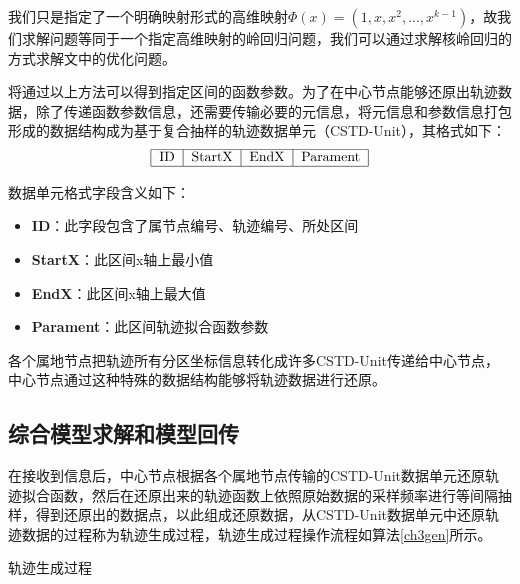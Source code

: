我们只是指定了一个明确映射形式的高维映射$\varPhi \left( x \right) =\left( 1,x,x^2,...,x^{k-1} \right) $，故我们求解问题等同于一个指定高维映射的岭回归问题，我们可以通过求解核岭回归的方式求解文中的优化问题。

将通过以上方法可以得到指定区间的函数参数。为了在中心节点能够还原出轨迹数据，除了传递函数参数信息，还需要传输必要的元信息，将元信息和参数信息打包形成的数据结构成为基于复合抽样的轨迹数据单元（CSTD-Unit），其格式如下：
$$
\begin{tabular}{|c|c|c|c|}
\hline ID&StartX&EndX&Parament\\
\hline
\end{tabular}
$$

数据单元格式字段含义如下：
\begin{itemize}
\item \textbf{ID}：此字段包含了属节点编号、轨迹编号、所处区间
\item \textbf{StartX}：此区间x轴上最小值
\item \textbf{EndX}：此区间x轴上最大值
\item \textbf{Parament}：此区间轨迹拟合函数参数
\end{itemize}

各个属地节点把轨迹所有分区坐标信息转化成许多CSTD-Unit传递给中心节点，中心节点通过这种特殊的数据结构能够将轨迹数据进行还原。

\subsection{综合模型求解和模型回传}

在接收到信息后，中心节点根据各个属地节点传输的CSTD-Unit数据单元还原轨迹拟合函数，然后在还原出来的轨迹函数上依照原始数据的采样频率进行等间隔抽样，得到还原出的数据点，以此组成还原数据，从CSTD-Unit数据单元中还原轨迹数据的过程称为轨迹生成过程，轨迹生成过程操作流程如算法\ref{ch3gen}所示。
\begin{algorithm}[H]
	 \caption{轨迹生成过程}
	\label{ch3gen}
\end{algorithm}

